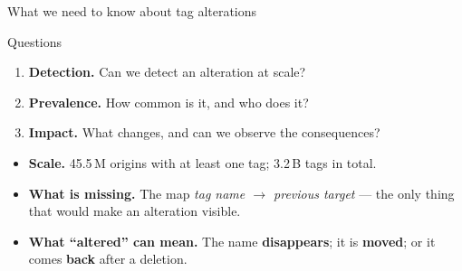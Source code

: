 \documentclass[aspectratio=169]{beamer}
\newcommand{\OriginsWithTagsShort}{\num{45.5}\,M\xspace}
\newcommand{\TotalTagsShort}{\num{3.2}\,B\xspace}
\begin{document}
\begin{frame}{What we need to know about tag alterations}
    \begin{block}{Questions}
        \begin{enumerate}\setlength{\itemsep}{0.1em}
            \item \textbf{Detection.} Can we detect an alteration at scale?
            \item \textbf{Prevalence.} How common is it, and who does it?
            \item \textbf{Impact.} What changes, and can we observe the consequences?
        \end{enumerate}
    \end{block}
    \begingroup\small
    \begin{itemize}\setlength{\itemsep}{0.55em}
        \item \textbf{Scale.} \OriginsWithTagsShort{} origins with at least one tag;
              \TotalTagsShort{} tags in total.
        \item \textbf{What is missing.} The map \emph{tag name $\rightarrow$ previous
              target} --- the only thing that would make an alteration visible.
        \item \textbf{What ``altered'' can mean.} The name \textbf{disappears}; it is \textbf{moved};
              or it comes \textbf{back} after a deletion.
    \end{itemize}
    \endgroup
\end{frame}
\end{document}
